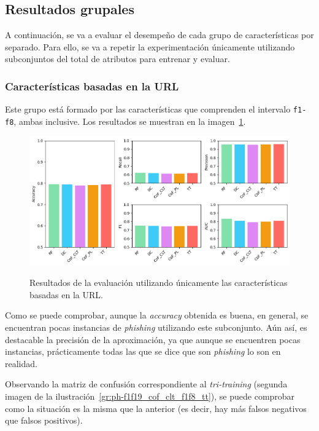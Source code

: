 \subsection{Resultados grupales}

A continuación, se va a evaluar el desempeño de cada grupo de características por separado. Para ello, se va a repetir la experimentación únicamente utilizando subconjuntos del total de atributos para entrenar y evaluar.

\subsubsection{Características basadas en la URL}

Este grupo está formado por las características que comprenden el intervalo \texttt{f1-f8}, ambas inclusive. Los resultados se muestran en la imagen~\ref{gr:ph-f1f8_small}.

\begin{figure}[h]
	\caption[\textit{Phishing}: detección (\texttt{f1-f8})]{Resultados de la evaluación utilizando únicamente las características basadas en la URL.}
	\centering
	\includegraphics[width=\textwidth]{../img/memoria/5_phishing/f1f8_big}
	\label{gr:ph-f1f8_small}
\end{figure}

Como se puede comprobar, aunque la \textit{accuracy} obtenida es buena, en general, se encuentran pocas instancias de \textit{phishing} utilizando este subconjunto. Aún así, es destacable la precisión de la aproximación, ya que aunque se encuentren pocas instancias, prácticamente todas las que se dice que son \textit{phishing} lo son en realidad.

Observando la matriz de confusión correspondiente al \textit{tri-training} (segunda imagen de la ilustración~\ref{gr:ph-f1f19_cof_clt_f1f8_tt}), se puede comprobar como la situación es la misma que la anterior (es decir, hay más falsos negativos que falsos positivos).

